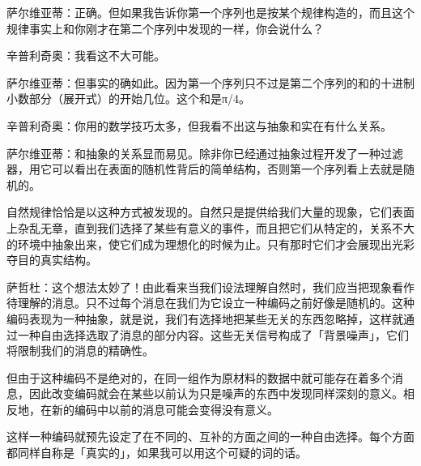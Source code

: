 \documentclass[
  12pt,
  twoside,
  openright,
  oldfontcommands,
]{memoir}
\newenvironment{fsquote}{%
  \begin{mdframed}[style=gebquote]\kaitifamily\small%
}{%
  \end{mdframed}%
}
\begin{document}
\begin{fsquote}
萨尔维亚蒂：正确。但如果我告诉你第一个序列也是按某个规律构造的，而且这个规律事实上和你刚才在第二个序列中发现的一样，你会说什么？
\end{fsquote}

\begin{fsquote}
辛普利奇奥：我看这不大可能。
\end{fsquote}

\begin{fsquote}
萨尔维亚蒂：但事实的确如此。因为第一个序列只不过是第二个序列的和的十进制小数部分（展开式）的开始几位。这个和是π/4。
\end{fsquote}

\begin{fsquote}
辛普利奇奥：你用的数学技巧太多，但我看不出这与抽象和实在有什么关系。
\end{fsquote}

\begin{fsquote}
萨尔维亚蒂：和抽象的关系显而易见。除非你已经通过抽象过程开发了一种过滤器，用它可以看出在表面的随机性背后的简单结构，否则第一个序列看上去就是随机的。
\end{fsquote}

\begin{fsquote}
自然规律恰恰是以这种方式被发现的。自然只是提供给我们大量的现象，它们表面上杂乱无章，直到我们选择了某些有意义的事件，而且把它们从特定的，关系不大的环境中抽象出来，使它们成为理想化的时候为止。只有那时它们才会展现出光彩夺目的真实结构。
\end{fsquote}

\begin{fsquote}
萨哲杜：这个想法太妙了！由此看来当我们设法理解自然时，我们应当把现象看作待理解的消息。只不过每个消息在我们为它设立一种编码之前好像是随机的。这种编码表现为一种抽象，就是说，我们有选择地把某些无关的东西忽略掉，这样就通过一种自由选择选取了消息的部分内容。这些无关信号构成了「背景噪声」，它们将限制我们的消息的精确性。
\end{fsquote}

\begin{fsquote}
但由于这种编码不是绝对的，在同一组作为原材料的数据中就可能存在着多个消息，因此改变编码就会在某些以前认为只是噪声的东西中发现同样深刻的意义。相反地，在新的编码中以前的消息可能会变得没有意义。
\end{fsquote}

\begin{fsquote}
这样一种编码就预先设定了在不同的、互补的方面之间的一种自由选择。每个方面都同样自称是「真实的」，如果我可以用这个可疑的词的话。
\end{fsquote}
\end{document}
